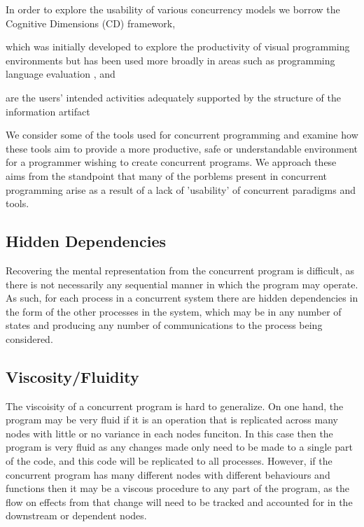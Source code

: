 \documentclass{sig-alternate}
\begin{document}
In order to explore the usability of various concurrency models we borrow the Cognitive Dimensions \cite{green89:_cognit_dimen_notat} (CD) framework, 



which was initially developed to explore the productivity of visual programming environments but has been used more broadly in areas such as programming language evaluation \cite{enpl}, and 

are the users’ intended activities adequately supported by the structure of the information artifact


We consider some of the tools used for concurrent programming and examine how these tools aim to provide a more productive, safe or understandable environment for a programmer wishing to create concurrent programs. We approach these aims from the standpoint that many of the porblems present in concurrent programming arise as a result of a lack of 'usability' of concurrent paradigms and tools.



\subsection{Hidden Dependencies}

Recovering the mental representation from the concurrent program is difficult, as there is not necessarily any sequential manner in which the program may operate. As such, for each process in a concurrent system there are hidden dependencies in the form of the other processes in the system, which may be in any number of states and producing any number of communications to the process being considered.

\subsection{Viscosity/Fluidity}
The viscoisity of a concurrent program is hard to generalize. On one hand, the program may be very fluid if it is an operation that is replicated across many nodes with little or no variance in each nodes funciton. In this case then the program is very fluid as any changes made only need to be made to a single part of the code, and this code will be replicated to all processes. However, if the concurrent program has many different nodes with different behaviours and functions then it may be a viscous procedure to any part of the program, as the flow on effects from that change will need to be tracked and accounted for in the downstream or dependent nodes.
\end{document}
